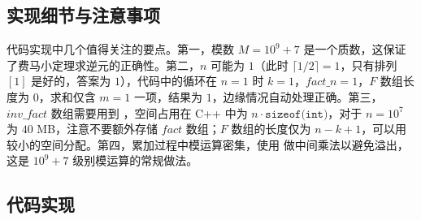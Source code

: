 \subsection{实现细节与注意事项}

代码实现中几个值得关注的要点。第一，模数 $M = 10^9 + 7$ 是一个质数，这保证了费马小定理求逆元的正确性。第二，$n$ 可能为 $1$（此时 $\lceil 1/2 \rceil = 1$，只有排列 $[1]$ 是好的，答案为 $1$），代码中的循环在 $n = 1$ 时 $k = 1$，$\mathit{fact\_n} = 1$，$F$ 数组长度为 $0$，求和仅含 $m = 1$ 一项，结果为 $1$，边缘情况自动处理正确。第三，$\mathit{inv\_fact}$ 数组需要用到 ，空间占用在 C++ 中为 $n \cdot \texttt{sizeof(int)}$，对于 $n = 10^7$ 为 $40$ MB，注意不要额外存储 $\mathit{fact}$ 数组；$F$ 数组的长度仅为 $n - k + 1$，可以用较小的空间分配。第四，累加过程中模运算密集，使用  做中间乘法以避免溢出，这是 $10^9 + 7$ 级别模运算的常规做法。

\subsection{代码实现}

\inputminted{c++}{../src/p09_mysterious_permutation.cpp}
